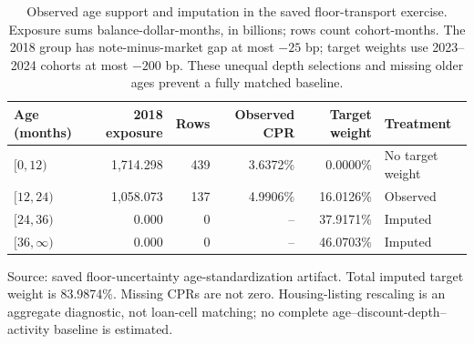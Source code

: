 \begin{table}[H]
\centering\small\singlespacing
\caption{Observed age support and imputation in the saved floor-transport exercise. Exposure sums balance-dollar-months, in billions; rows count cohort-months. The 2018 group has note-minus-market gap at most $-25$ bp; target weights use 2023--2024 cohorts at most $-200$ bp. These unequal depth selections and missing older ages prevent a fully matched baseline.}
\label{tab:floorsupport}
\begin{tabular}{@{}lrrrrl@{}}
\toprule
Age (months) & 2018 exposure & Rows & Observed CPR & Target weight & Treatment\\\midrule
$[0,12)$ & 1,714.298 & 439 & 3.6372\% & 0.0000\% & No target weight\\
$[12,24)$ & 1,058.073 & 137 & 4.9906\% & 16.0126\% & Observed\\
$[24,36)$ & 0.000 & 0 & -- & 37.9171\% & Imputed\\
$[36,\infty)$ & 0.000 & 0 & -- & 46.0703\% & Imputed\\\bottomrule
\end{tabular}
\par\smallskip\raggedright\footnotesize
Source: saved floor-uncertainty age-standardization artifact. Total imputed target weight is 83.9874\%. Missing CPRs are not zero. Housing-listing rescaling is an aggregate diagnostic, not loan-cell matching; no complete age--discount-depth--activity baseline is estimated.
\end{table}
